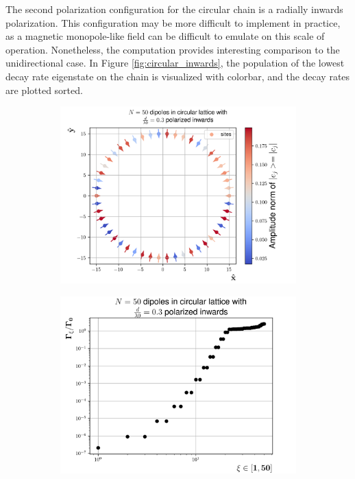 \documentclass{article}
\begin{document}
The second polarization configuration for the circular chain is a radially inwards polarization. This configuration may be more difficult to implement in practice, as a magnetic monopole-like field can be difficult to emulate on this scale of operation. Nonetheless, the computation provides interesting comparison to the unidirectional case. In Figure \ref{fig:circular_inwards}, the population of the lowest decay rate eigenstate on the chain is visualized with colorbar, and the decay rates are plotted sorted. 

\begin{figure}[H]
    \centering
    \begin{subfigure}[b]{0.49\textwidth}
        \includegraphics[width=\textwidth]{figs/dipoles_case_circular_inwards_lowest.png}
        \caption{}
        \label{fig:circular_inwards_lowest_eigenstate}
    \end{subfigure}
    \hfill
    \begin{subfigure}[b]{0.49\textwidth}
        \includegraphics[width=\textwidth]{figs/case_circular_inwards_d_03.png}

\end{subfigure}
\end{figure}
\end{document}

